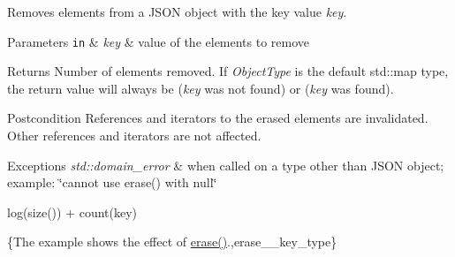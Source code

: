 Removes elements from a J\-S\-O\-N object with the key value {\itshape key}.


\begin{DoxyParams}[1]{Parameters}
\mbox{\tt in}  & {\em key} & value of the elements to remove\\
\hline
\end{DoxyParams}
\begin{DoxyReturn}{Returns}
Number of elements removed. If {\itshape Object\-Type} is the default {\ttfamily std\-::map} type, the return value will always be {} ({\itshape key} was not found) or {} ({\itshape key} was found).
\end{DoxyReturn}
\begin{DoxyPostcond}{Postcondition}
References and iterators to the erased elements are invalidated. Other references and iterators are not affected.
\end{DoxyPostcond}

\begin{DoxyExceptions}{Exceptions}
{\em std\-::domain\-\_\-error} & when called on a type other than J\-S\-O\-N object; example\-: {\ttfamily \char`\"{}cannot use erase() with null\char`\"{}}\\
\hline
\end{DoxyExceptions}
{\ttfamily log(size()) + count(key)}

\{The example shows the effect of {\ttfamily \hyperlink{classnlohmann_1_1basic__json_a45e789042a23138eba2b69f34df9fc45}{erase()}}.,erase\-\_\-\-\_\-key\-\_\-type\}

